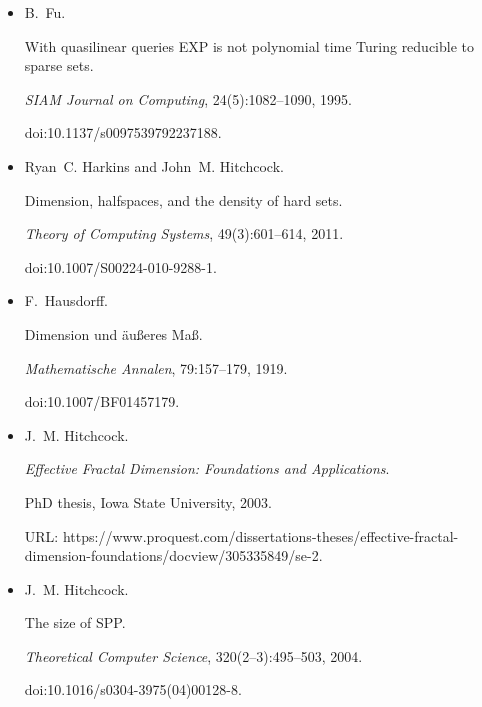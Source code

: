 \begin{itemize}
doi:10.1016/j.ipl.2005.03.009.





\item[] 
[25]

B. Fu.


With quasilinear queries EXP is not polynomial time Turing
reducible to sparse sets.


\emph{SIAM Journal on Computing}, 24(5):1082–1090, 1995.


doi:10.1137/s0097539792237188.





\item[] 
[26]

Ryan C. Harkins and John M. Hitchcock.


Dimension, halfspaces, and the density of hard sets.


\emph{Theory of Computing Systems}, 49(3):601–614, 2011.


doi:10.1007/S00224-010-9288-1.





\item[] 
[27]

F. Hausdorff.


Dimension und äußeres Maß.


\emph{Mathematische Annalen}, 79:157–179, 1919.


doi:10.1007/BF01457179.





\item[] 
[28]

J. M. Hitchcock.


\emph{Effective Fractal Dimension: Foundations and Applications}.


PhD thesis, Iowa State University, 2003.


URL:
https://www.proquest.com/dissertations-theses/effective-fractal-dimension-foundations/docview/305335849/se-2.





\item[] 
[29]

J. M. Hitchcock.


The size of SPP.


\emph{Theoretical Computer Science}, 320(2–3):495–503, 2004.


doi:10.1016/s0304-3975(04)00128-8.






\end{itemize}
